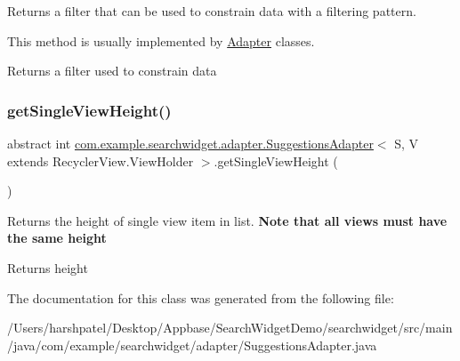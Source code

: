 Returns a filter that can be used to constrain data with a filtering pattern.

This method is usually implemented by \mbox{\hyperlink{}{Adapter}} classes.

\begin{DoxyReturn}{Returns}
a filter used to constrain data 
\end{DoxyReturn}
\mbox{\label{classcom_1_1example_1_1searchwidget_1_1adapter_1_1_suggestions_adapter_aaf293d78ccf1a0fd43c9c3dee5dbd567}} 
\subsubsection{\texorpdfstring{getSingleViewHeight()}{getSingleViewHeight()}}
{\footnotesize\ttfamily abstract int \mbox{\hyperlink{classcom_1_1example_1_1searchwidget_1_1adapter_1_1_suggestions_adapter}{com.\+example.\+searchwidget.\+adapter.\+Suggestions\+Adapter}}$<$ S, V extends Recycler\+View.\+View\+Holder $>$.get\+Single\+View\+Height (\begin{DoxyParamCaption}{ }\end{DoxyParamCaption})\hspace{0.3cm}{\ttfamily [abstract]}}

Returns the height of single view item in list. {\bfseries{Note that all views must have the same height}} \begin{DoxyReturn}{Returns}
height 
\end{DoxyReturn}


The documentation for this class was generated from the following file\+:\begin{DoxyCompactItemize}
\item 
/\+Users/harshpatel/\+Desktop/\+Appbase/\+Search\+Widget\+Demo/searchwidget/src/main/java/com/example/searchwidget/adapter/Suggestions\+Adapter.\+java\end{DoxyCompactItemize}
